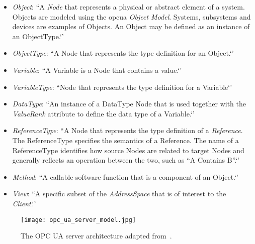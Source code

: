 \documentclass[
a4paper,
twoside,
headsepline,
cleardoublepage=empty,
parskip=half,
draft=false
]{scrbook}
\begin{document}
				\begin{itemize}

					\item \textit{Object}: ``A \textit{Node} that represents a physical or abstract element of a system. Objects are modeled using the \gls{opcua} \textit{Object Model}. Systems, subsystems and devices are examples of Objects. An Object may be defined as an instance of an ObjectType.`'~\cite{opcfoundation2017part1}

					\item \textit{ObjectType}: ``A Node that represents the type definition
					for an Object.`'~\cite{opcfoundation2017part1}

					\item \textit{Variable}: ``A Variable is a Node that contains a value.`'~\cite{opcfoundation2017part1}

					\item \textit{VariableType}: ``Node that represents the type definition for a Variable`'~\cite{opcfoundation2018part3}

					\item \textit{DataType}: ``An instance of a DataType Node that is used together with the \textit{ValueRank} attribute to define the data type of a Variable.`'~\cite{opcfoundation2018part3}

					\item \textit{ReferenceType}: ``A Node that represents the type definition of a \textit{Reference}. The ReferenceType specifies the semantics of a Reference. The name of a ReferenceType identifies how source Nodes are related to target Nodes and generally reflects an operation between the two, such as “A Contains B”.`'~\cite{opcfoundation2017part1}

					\item \textit{Method}: ``A callable software function that is a component of an Object.`'~\cite{opcfoundation2017part1}

					\item \textit{View}: ``A specific subset of the \textit{AddressSpace} that is of interest to the \textit{Client}.`'~\cite{opcfoundation2017part1}

				\end{itemize}

				\begin{figure}[htbp]
					\centering
					\texttt{[image: opc\_ua\_server\_model.jpg]}
					\caption{The OPC UA server architecture adapted from~\cite{opcfoundation2017part1}.}
					\label{fig:opc_ua_server_model}
				\end{figure}
\end{document}
